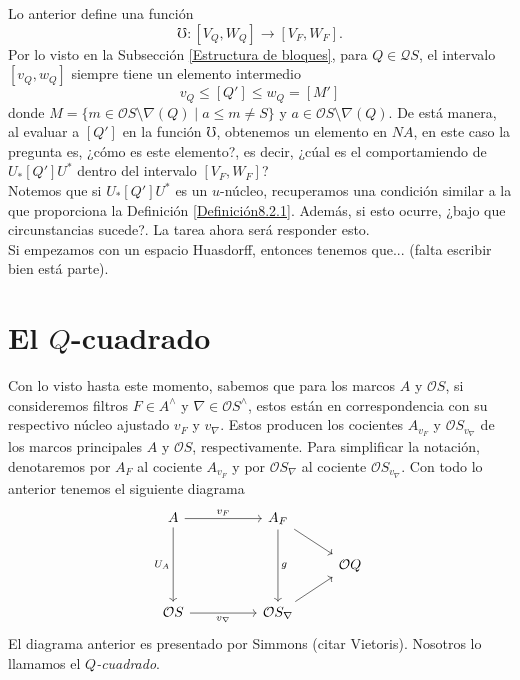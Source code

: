 Lo anterior define una función 
\[
\mho\colon [V_Q, W_Q]\to [V_F, W_F].
\]
Por lo visto en la Subsección \ref{Estructura de bloques}, para $Q\in \mathcal{Q}S$, el intervalo $[v_Q, w_Q]$ siempre tiene un elemento intermedio
\[
v_Q\leq [Q']\leq w_Q=[M']
\]
donde $M=\{m\in \mathcal{O}S\setminus \nabla(Q)\mid a\leq m\neq S\}$ y $a\in \mathcal{O}S\setminus \nabla(Q)$. De está manera, al evaluar a $[Q']$ en la función $\mho$, obtenemos
un elemento en $NA$, en este caso la pregunta es, ¿cómo es este elemento?, es decir, ¿cúal es el comportamiendo de $U_*[Q']U^*$ dentro del intervalo $[V_F, W_F]$?\\

Notemos que si $U_*[Q']U^*$ es un $u$-núcleo, recuperamos una condición similar a la que proporciona la Definición \ref{Definición8.2.1}. Además, si esto ocurre, ¿bajo que circunstancias 
sucede?. La tarea ahora será responder esto.\\

Si empezamos con un espacio Huasdorff, entonces tenemos que... (falta escribir bien está parte).

\section{El $Q$-cuadrado}\label{Qcuadrado}

Con lo visto hasta este momento, sabemos que para los marcos $A$ y $\mathcal{O}S$, si consideremos filtros $F\in A^\wedge$ y $\nabla\in \mathcal{O}S^\wedge$, estos están en correspondencia con su respectivo núcleo ajustado
$v_F$ y $v_\nabla$. Estos producen los cocientes $A_{v_F}$ y $\mathcal{O}S_{v_\nabla}$ de los marcos principales $A$ y $\mathcal{O}S$, respectivamente. Para simplificar la notación, denotaremos por $A_F$ al cociente $A_{v_F}$ 
y por $\mathcal{O}S_\nabla$ al cociente $\mathcal{O}S_{v_\nabla}$. Con todo lo anterior tenemos el siguiente diagrama
\[
\begin{tikzcd}
	A && {A_F} \\
	&&& {\mathcal{O}Q} \\
	{\mathcal{O}S} && {\mathcal{O}S_\nabla}
	\arrow["{v_F}", from=1-1, to=1-3]
	\arrow["{U_A}"', from=1-1, to=3-1]
	\arrow[from=1-3, to=2-4]
	\arrow["g", from=1-3, to=3-3]
	\arrow["{v_\nabla}"', from=3-1, to=3-3]
	\arrow[from=3-3, to=2-4]
\end{tikzcd}
\]
El diagrama anterior es presentado por Simmons (citar Vietoris). Nosotros lo llamamos el \emph{$Q$-cuadrado}.\\

